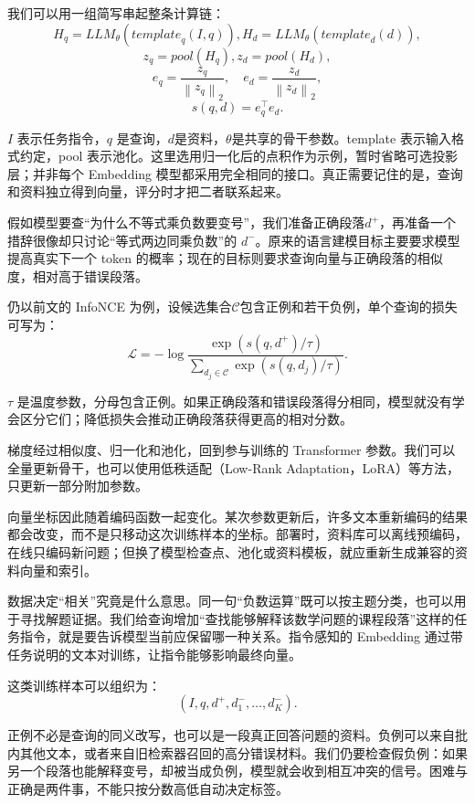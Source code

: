 我们可以用一组简写串起整条计算链：
\[{H_{q} = {LLM}_{\theta}\left( {template}_{q}(I,q) \right),
}{H_{d} = {LLM}_{\theta}\left( {template}_{d}(d) \right),}\]
\[z_{q} = {pool}\left( H_{q} \right),z_{d} = {pool}\left( H_{d} \right),\]
\[e_{q} = \frac{z_{q}}{\left\| z_{q} \right\|_{2}},\quad e_{d} = \frac{z_{d}}{\left\| z_{d} \right\|_{2}},\]
\[s(q,d) = e_{q}^{\top}e_{d}.\]

\(I\) 表示任务指令，\(q\) 是查询，\(d\)是资料，\(\theta\)是共享的骨干参数。template 表示输入格式约定，pool 表示池化。这里选用归一化后的点积作为示例，暂时省略可选投影层；并非每个 Embedding 模型都采用完全相同的接口。真正需要记住的是，查询和资料独立得到向量，评分时才把二者联系起来。

假如模型要查``为什么不等式乘负数要变号''，我们准备正确段落\(d^{+}\)，再准备一个措辞很像却只讨论``等式两边同乘负数''的 \(d^{-}\)。原来的语言建模目标主要要求模型提高真实下一个 token 的概率；现在的目标则要求查询向量与正确段落的相似度，相对高于错误段落。

仍以前文的 InfoNCE 为例，设候选集合\(\mathcal{C}\)包含正例和若干负例，单个查询的损失可写为：
\[\mathcal{L} = - \log\frac{\exp\left( s\left( q,d^{+} \right)/\tau \right)}{\sum_{d_{j} \in \mathcal{C}}^{}{\exp\left( s\left( q,d_{j} \right)/\tau \right)}}.\]

\(\tau\) 是温度参数，分母包含正例。如果正确段落和错误段落得分相同，模型就没有学会区分它们；降低损失会推动正确段落获得更高的相对分数。

梯度经过相似度、归一化和池化，回到参与训练的 Transformer 参数。我们可以全量更新骨干，也可以使用低秩适配（Low-Rank Adaptation，LoRA）等方法，只更新一部分附加参数。

向量坐标因此随着编码函数一起变化。某次参数更新后，许多文本重新编码的结果都会改变，而不是只移动这次训练样本的坐标。部署时，资料库可以离线预编码，在线只编码新问题；但换了模型检查点、池化或资料模板，就应重新生成兼容的资料向量和索引。

数据决定``相关''究竟是什么意思。同一句``负数运算''既可以按主题分类，也可以用于寻找解题证据。我们给查询增加``查找能够解释该数学问题的课程段落''这样的任务指令，就是要告诉模型当前应保留哪一种关系。指令感知的 Embedding 通过带任务说明的文本对训练，让指令能够影响最终向量。

这类训练样本可以组织为：
\[\left( I,q,d^{+},d_{1}^{-},\ldots,d_{K}^{-} \right).\]

正例不必是查询的同义改写，也可以是一段真正回答问题的资料。负例可以来自批内其他文本，或者来自旧检索器召回的高分错误材料。我们仍要检查假负例：如果另一个段落也能解释变号，却被当成负例，模型就会收到相互冲突的信号。困难与正确是两件事，不能只按分数高低自动决定标签。

